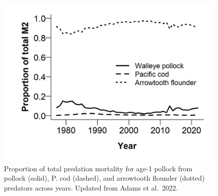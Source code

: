\documentclass[
]{article}
\begin{document}
\begin{figure}
\centering
\includegraphics{Results/ESR_Fig3.jpg}
\caption{Proportion of total predation mortality for age-1 pollock from
pollock (solid), P. cod (dashed), and arrowtooth flounder (dotted)
predators across years. Updated from Adams et al.~2022.}
\end{figure}
\end{document}
